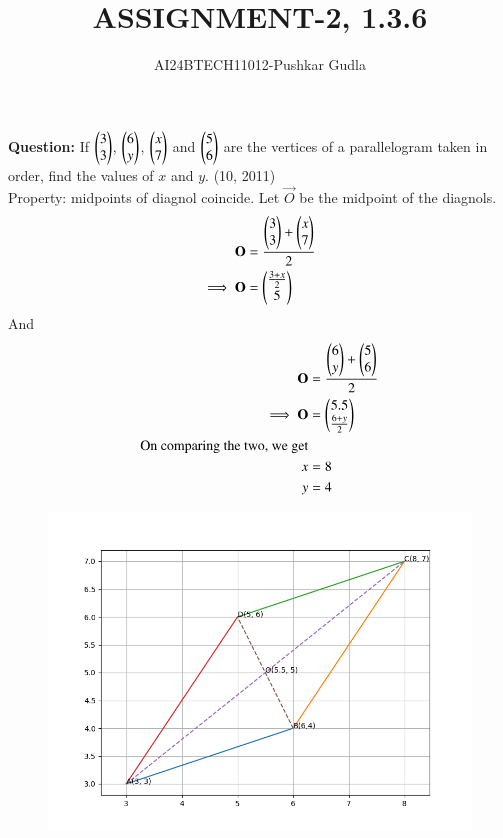 \documentclass[journal]{IEEEtran}
\begin{document}

\vspace{3cm}

\title{ASSIGNMENT-2, 1.3.6}
\author{AI24BTECH11012-Pushkar Gudla}
\maketitle

\renewcommand{\thefigure}{\theenumi}
\renewcommand{\thetable}{\theenumi}
\setlength{\intextsep}{10pt} %

\renewcommand{\thetable}{\theenumi}

\textbf{Question:} If $\begin{pmatrix}3\\3\end{pmatrix}$, $\begin{pmatrix}6\\y\end{pmatrix}$, $\begin{pmatrix}x\\7\end{pmatrix}$ and $\begin{pmatrix}5\\6\end{pmatrix}$ are the vertices of a parallelogram taken in order, find the values of $x$ and $y$. 
		\hfill{(10, 2011)}\\

		\solution Property: midpoints of diagnol coincide. Let $\vec{O}$ be the midpoint of the diagnols. \\
		\begin{align}
			\mathbf{O} &=\frac{\begin{pmatrix}3\\3\end{pmatrix}+\begin{pmatrix}x\\7\end{pmatrix}}{2}\\
			\implies \mathbf{O} &= \begin{pmatrix}\frac{3+x}{2}\\5\end{pmatrix}\\
		\end{align}
		And \\
		\begin{align}
			\mathbf{O} &= \frac{\begin{pmatrix}6\\y\end{pmatrix}+\begin{pmatrix}5\\6\end{pmatrix}}{2}\\
		\implies	\mathbf{O} &= \begin{pmatrix}5.5\\\frac{6+y}{2}\end{pmatrix}\\
			\text{On comparing the two, we get}\\
			x &= 8\\
			y &= 4\\
		\end{align}

\begin{figure}[H]
	\centering
	\includegraphics[scale=0.7]{figs/parallelogram.png}
	\label{Fig}
\end{figure}
\end{document}
